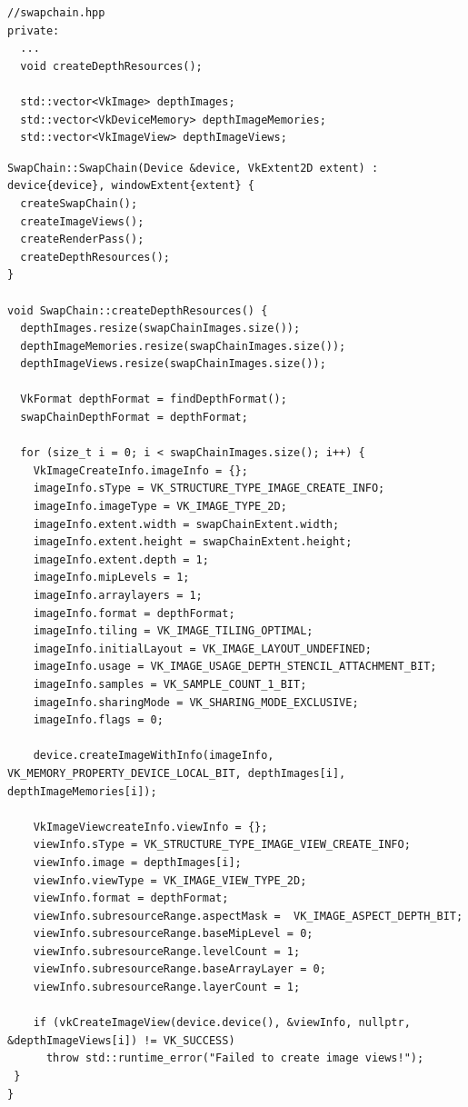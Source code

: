 \documentclass[12pt]{report} \usepackage{preamble}
\begin{document}
\begin{lstlisting}[Language=C++]
//swapchain.hpp
private:
  ...
  void createDepthResources();

  std::vector<VkImage> depthImages;
  std::vector<VkDeviceMemory> depthImageMemories;
  std::vector<VkImageView> depthImageViews;
\end{lstlisting}

\begin{lstlisting}[Language=C++]
SwapChain::SwapChain(Device &device, VkExtent2D extent) : device{device}, windowExtent{extent} {
  createSwapChain();
  createImageViews();
  createRenderPass();
  createDepthResources();
}

void SwapChain::createDepthResources() {
  depthImages.resize(swapChainImages.size());
  depthImageMemories.resize(swapChainImages.size());
  depthImageViews.resize(swapChainImages.size());

  VkFormat depthFormat = findDepthFormat();
  swapChainDepthFormat = depthFormat;

  for (size_t i = 0; i < swapChainImages.size(); i++) {
    VkImageCreateInfo.imageInfo = {};
    imageInfo.sType = VK_STRUCTURE_TYPE_IMAGE_CREATE_INFO;
    imageInfo.imageType = VK_IMAGE_TYPE_2D;
    imageInfo.extent.width = swapChainExtent.width;
    imageInfo.extent.height = swapChainExtent.height;
    imageInfo.extent.depth = 1;
    imageInfo.mipLevels = 1;
    imageInfo.arraylayers = 1;
    imageInfo.format = depthFormat;
    imageInfo.tiling = VK_IMAGE_TILING_OPTIMAL;
    imageInfo.initialLayout = VK_IMAGE_LAYOUT_UNDEFINED;
    imageInfo.usage = VK_IMAGE_USAGE_DEPTH_STENCIL_ATTACHMENT_BIT;
    imageInfo.samples = VK_SAMPLE_COUNT_1_BIT;
    imageInfo.sharingMode = VK_SHARING_MODE_EXCLUSIVE;
    imageInfo.flags = 0;

    device.createImageWithInfo(imageInfo, VK_MEMORY_PROPERTY_DEVICE_LOCAL_BIT, depthImages[i], depthImageMemories[i]);

    VkImageViewcreateInfo.viewInfo = {};
    viewInfo.sType = VK_STRUCTURE_TYPE_IMAGE_VIEW_CREATE_INFO;
    viewInfo.image = depthImages[i];
    viewInfo.viewType = VK_IMAGE_VIEW_TYPE_2D;
    viewInfo.format = depthFormat;
    viewInfo.subresourceRange.aspectMask =  VK_IMAGE_ASPECT_DEPTH_BIT;
    viewInfo.subresourceRange.baseMipLevel = 0;
    viewInfo.subresourceRange.levelCount = 1;
    viewInfo.subresourceRange.baseArrayLayer = 0;
    viewInfo.subresourceRange.layerCount = 1;

    if (vkCreateImageView(device.device(), &viewInfo, nullptr, &depthImageViews[i]) != VK_SUCCESS)
      throw std::runtime_error("Failed to create image views!");
 }
}
\end{lstlisting}
\end{document}
